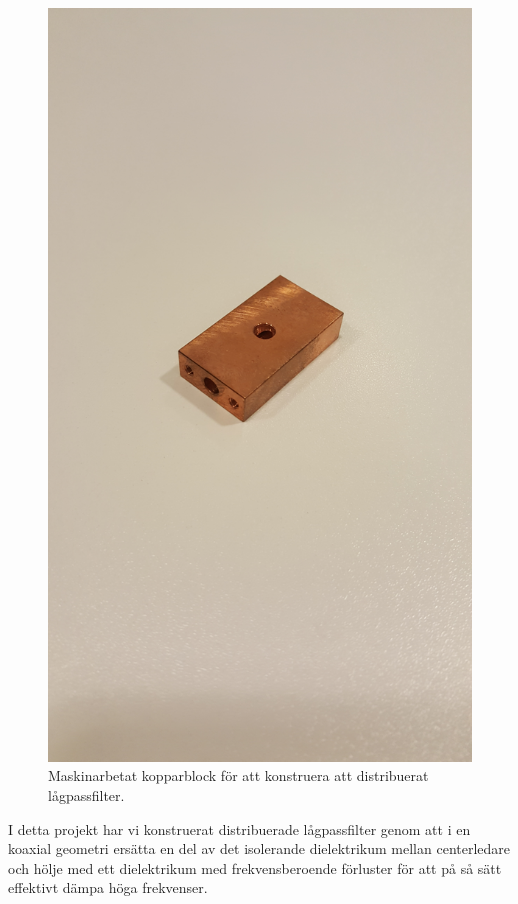 \documentclass[main.tex]{subfiles}
\begin{document}
\begin{figure}
    \centering
    \includegraphics[angle=-90,trim=1550 300 1950 300,clip,width=0.975\linewidth]{figure/Filterbilder/filterbox.jpg}
    \caption{Maskinarbetat kopparblock för att konstruera att distribuerat lågpassfilter.}
    \label{fig:filterbox}
\end{figure}
I detta projekt har vi konstruerat distribuerade lågpassfilter genom att i en koaxial geometri ersätta en del av det isolerande dielektrikum mellan centerledare och hölje med ett dielektrikum med frekvensberoende förluster för att på så sätt effektivt dämpa höga frekvenser.  
\end{document}
